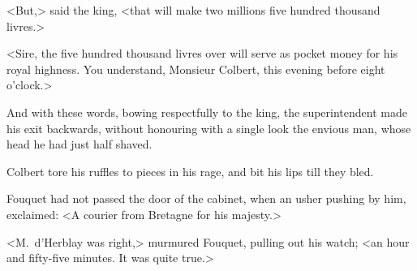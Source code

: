<But,> said the king, <that will make two millions five hundred thousand livres.>

<Sire, the five hundred thousand livres over will serve as pocket money for his royal highness. You understand, Monsieur Colbert, this evening before eight o'clock.>

And with these words, bowing respectfully to the king, the superintendent made his exit backwards, without honouring with a single look the envious man, whose head he had just half shaved.

Colbert tore his ruffles to pieces in his rage, and bit his lips till they bled.

Fouquet had not passed the door of the cabinet, when an usher pushing by him, exclaimed: <A courier from Bretagne for his majesty.>

<M.~d'Herblay was right,> murmured Fouquet, pulling out his watch; <an hour and fifty-five minutes. It was quite true.>